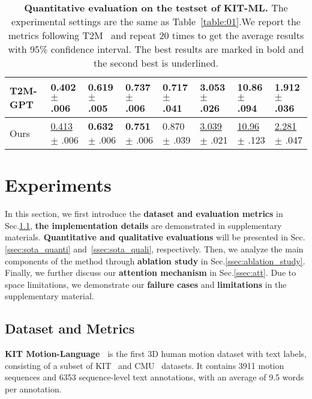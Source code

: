 \documentclass[10pt,twocolumn,letterpaper]{article}
\begin{document}
\begin{table*}[ht]
\begin{center}
\begin{tabular}{p{2.15cm}p{1.70cm}p{1.70cm}p{1.70cm}p{1.70cm}p{1.70cm}p{1.70cm}p{1.70cm}}
T2M-GPT~\cite{zhang2023t2m}& 0.402 \tiny $\pm$ .006& 0.619  \tiny $\pm$ .005& 0.737  \tiny $\pm$ .006& 0.717 \tiny $\pm$ .041&3.053  \tiny $\pm$ .026 &10.86 \tiny $\pm$ .094 &1.912 \tiny $\pm$ .036\\

\hline

Ours& \underline{0.413} \tiny $\pm$ .006& \textbf{0.632}  \tiny $\pm$ .006& \textbf{0.751}  \tiny $\pm$ .006& 0.870  \tiny $\pm$ .039&\underline{3.039}  \tiny $\pm$ .021 &\underline{10.96} \tiny $\pm$ .123 &\underline{2.281} \tiny $\pm$ .047\\
\hline
\end{tabular}
\end{center}
\caption{\textbf{Quantitative evaluation on the testset of KIT-ML.} The experimental settings are the same as Table~\ref{table:01}.We report the metrics following T2M~\cite{guo2022generating} and repeat 20 times to get the average results with 95\% confidence interval. The best results are marked in bold and the second best is underlined.}
\label{table:02}
\end{table*}

\section{Experiments}
In this section, we first introduce the \textbf{dataset and evaluation metrics} in Sec.\ref{ssec:dataset}, \textbf{the implementation details} are demonstrated in supplementary materials. \textbf{Quantitative and qualitative evaluations} will be presented in Sec.\ref{ssec:sota_quanti} and~\ref{ssec:sota_quali}, respectively. Then, we analyze the main components of the method through \textbf{ablation study} in Sec.\ref{ssec:ablation_study}. Finally, we further discuss our \textbf{attention mechanism} in Sec.\ref{ssec:att}. Due to space limitations, we demonstrate our \textbf{failure cases} and \textbf{limitations} in the supplementary material.




\subsection{Dataset and Metrics}\label{ssec:dataset}
\textbf{KIT Motion-Language~\cite{plappert2016kit}} is the first 3D human motion dataset with text labels, consisting of a subset of KIT~\cite{Mandery2015a} and CMU~\cite{cmu} datasets. It contains 3911 motion sequences and 6353 sequence-level text annotations, with an average of 9.5 words per annotation. 
\end{document}
